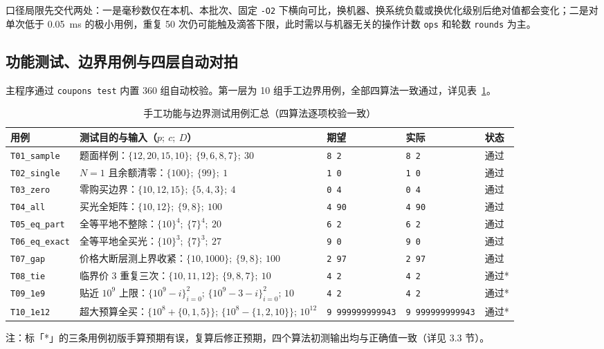 \documentclass[12pt,a4paper,fontset=windows]{ctexart}
\theoremstyle{plain}
\newcommand{\code}[1]{\texttt{#1}}
\newcommand{\tabhead}[1]{\textbf{#1}}
\begin{document}
口径局限先交代两处：一是毫秒数仅在本机、本批次、固定 \code{-O2} 下横向可比，换机器、换系统负载或换优化级别后绝对值都会变化；二是对单次低于 0.05~ms 的极小用例，重复 50 次仍可能触及滴答下限，此时需以与机器无关的操作计数 \code{ops} 和轮数 \code{rounds} 为主。

\subsection{功能测试、边界用例与四层自动对拍}

主程序通过 \code{coupons test} 内置 360 组自动校验。第一层为 10 组手工边界用例，全部四算法一致通过，详见表~\ref{tab:fixed_cases}。

\begin{table}[htbp]
\centering
\caption{手工功能与边界测试用例汇总（四算法逐项校验一致）}
\label{tab:fixed_cases}
\footnotesize
\setlength{\tabcolsep}{3.0pt}
\begin{tabular}{@{}l>{\raggedright\arraybackslash}p{4.9cm}lll@{}}
\toprule
\rowcolor{gray!12}\tabhead{用例} & \tabhead{测试目的与输入（$p;\ c;\ D$）} & \tabhead{期望} & \tabhead{实际} & \tabhead{状态} \\
\midrule
\code{T01\_sample} & 题面样例：$\{12,20,15,10\};\ \{9,6,8,7\};\ 30$ & \code{8 2} & \code{8 2} & 通过 \\
\code{T02\_single} & $N=1$ 且余额清零：$\{100\};\ \{99\};\ 1$ & \code{1 0} & \code{1 0} & 通过 \\
\code{T03\_zero} & 零购买边界：$\{10,12,15\};\ \{5,4,3\};\ 4$ & \code{0 4} & \code{0 4} & 通过 \\
\code{T04\_all} & 买光全矩阵：$\{10,12\};\ \{9,8\};\ 100$ & \code{4 90} & \code{4 90} & 通过 \\
\code{T05\_eq\_part} & 全等平地不整除：$\{10\}^4;\ \{7\}^4;\ 20$ & \code{6 2} & \code{6 2} & 通过 \\
\code{T06\_eq\_exact} & 全等平地全买光：$\{10\}^3;\ \{7\}^3;\ 27$ & \code{9 0} & \code{9 0} & 通过 \\
\code{T07\_gap} & 价格大断层测上界收紧：$\{10,1000\};\ \{9,8\};\ 100$ & \code{2 97} & \code{2 97} & 通过 \\
\code{T08\_tie} & 临界价 3 重复三次：$\{10,11,12\};\ \{9,8,7\};\ 10$ & \code{4 2} & \code{4 2} & 通过* \\
\code{T09\_1e9} & 贴近 $10^9$ 上限：$\{10^9{-}i\}_{i=0}^2$; $\{10^9{-}3{-}i\}_{i=0}^2$; $10$ & \code{4 2} & \code{4 2} & 通过* \\
\code{T10\_1e12} & 超大预算全买：$\{10^8{+}\{0,1,5\}\}$; $\{10^8{-}\{1,2,10\}\}$; $10^{12}$ & \code{9 999999999943} & \code{9 999999999943} & 通过* \\
\bottomrule
\end{tabular}

\vspace{0.25em}
{\scriptsize 注：标「*」的三条用例初版手算预期有误，复算后修正预期，四个算法初测输出均与正确值一致（详见 3.3 节）。}
\end{table}
\end{document}
